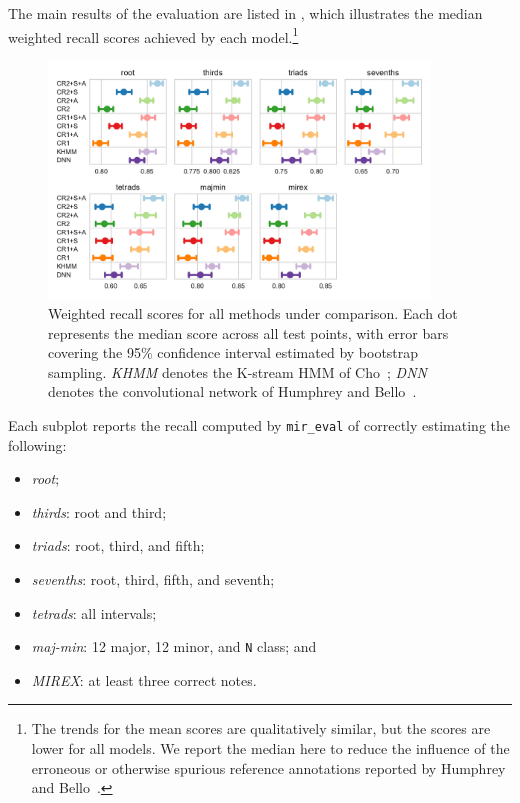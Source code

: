 \documentclass{article}
\begin{document}
The main results of the evaluation are listed in , which illustrates the median weighted recall scores achieved by each model.\footnote{The trends for the mean scores are qualitatively similar, but the scores are lower for all models. We report the median here to reduce the influence of the erroneous or otherwise spurious reference annotations reported by Humphrey and Bello~\cite{humphrey2015four}.}
\begin{figure}[t]
    \centering
    \includegraphics[width=0.9\textwidth]{crnn-scores}
    \caption{Weighted recall scores for all methods under comparison.  Each dot represents the median score across all test points, with error bars covering the 95\% confidence interval estimated by bootstrap sampling.
        \emph{KHMM} denotes the K-stream HMM of Cho~\cite{cho2014improved}; \emph{DNN} denotes the convolutional network of Humphrey and Bello~\cite{humphrey2015four}.\label{fig:results}}
\end{figure}
Each subplot reports the recall computed by \texttt{mir\_eval} of correctly estimating the following:
\begin{itemize}
    \item \emph{root};
    \item \emph{thirds}: root and third;
    \item \emph{triads}: root, third, and fifth;
    \item \emph{sevenths}: root, third, fifth, and seventh;
    \item \emph{tetrads}: all intervals;
    \item \emph{maj-min}: 12 major, 12 minor, and \texttt{N} class; and
    \item \emph{MIREX}: at least three correct notes.
\end{itemize}
\end{document}
